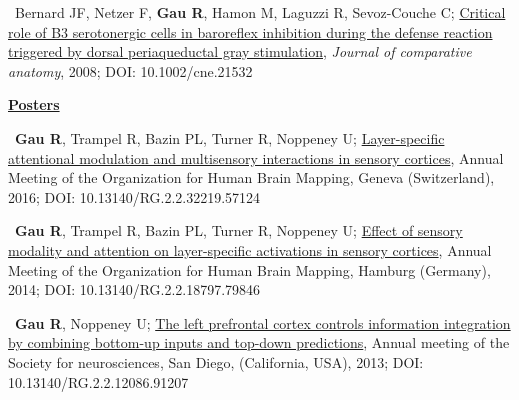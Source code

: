 \documentclass[a4paper,12pt,oneside]{letter}
\begin{document}
{\textbullet~Bernard JF, Netzer F, \textbf{Gau R}, Hamon M, Laguzzi R, Sevoz-Couche C; 
\href{http://www.researchgate.net/profile/Remi_Gau/publication/5856955_Critical_role_of_B3_serotonergic_cells_in_baroreflex_inhibition_during_the_defense_reaction_triggered_by_dorsal_periaqueductal_gray_stimulation/links/586bf81d08ae6eb871bb6f47.pdf}{Critical role of B3 serotonergic cells in baroreflex inhibition during the defense reaction triggered by dorsal periaqueductal gray stimulation}, \textit{Journal of comparative anatomy}, 2008; DOI: 10.1002/cne.21532


\begin{center}
 \href{https://osf.io/xgdh7/}{\large\textbf{Posters}}
\end{center}

\textbullet~\textbf{Gau R}, Trampel R, Bazin PL, Turner R, Noppeney U; \href{http://www.researchgate.net/profile/Remi_Gau/publication/312040907_Layer-specific_attentional_modulation_and_multisensory_interactions_in_sensory_cortices/links/586bec8108ae8fce4919e07e.pdf?origin=publication_detail&ev=pub_int_prw_xdl&msrp=ebfE-ttTbrYfVzAofje5aX7FDjiW85HC3yqk8seJjhsOoLqmeRviQBtfDuXmv_czDArKxDp2vM32swxlbQzyvbVTbKL6xRpsEZ-BeqgslOo.KWD8vv500DrprbLnXSrDxinWDQrliScdbic1rjyyqLUG12KOwbjri9jbFDwSYWMkGLoSocKyAei7eQLoDCU9Dw.4eQVGmpcVG-AAQDI4KiYt-xA9SDkF_u7xvWOznoi52trnfagq5aJVIAgpfhgitdzt3LYuUPdJ8gE6jmG5I94Nw}{Layer-specific attentional modulation and multisensory interactions in sensory cortices}, Annual Meeting of the Organization for Human Brain Mapping, Geneva (Switzerland), 2016; DOI: 10.13140/RG.2.2.32219.57124

\textbullet~\textbf{Gau R}, Trampel R, Bazin PL, Turner R, Noppeney U; \href{http://www.researchgate.net/profile/Remi_Gau/publication/312040995_Effect_of_sensory_modality_and_attention_on_layer-specific_activations_in_sensory_cortices/links/586bef4108ae329d621216ff.pdf?origin=publication_detail&ev=pub_int_prw_xdl&msrp=rWGQkC7vAu_P6H2YxCI3M31egmAPzpbXdoRN1OdTlFE2ytvRyytc2DItV2mPnvlGPXAOT-Q0hOx0cWKEfhvF_ZK7oOzQtXTOX1cxj1f7wdc.EjFU3lhxIUR_qptyNrCYqZDXVg6nG7zWe8VL0WxLSdSMUGnjz_v4L5Yov-RWctdEwDPFRXLasy1FBdCk7Dlydw.IANTdlTw5MPB88HQJNdTi7lFv6Sygddbknct3mMTSsgH20heYrYcKnbsQLxtcsNd-HHWZUEIEP4-7bkQLNDUhQ}{Effect of sensory modality and attention on layer-specific activations in sensory cortices}, Annual Meeting of the Organization for Human Brain Mapping, Hamburg (Germany), 2014; DOI: 10.13140/RG.2.2.18797.79846

\textbullet~\textbf{Gau R}, Noppeney U; \href{http://www.researchgate.net/profile/Remi_Gau/publication/312040995_Effect_of_sensory_modality_and_attention_on_layer-specific_activations_in_sensory_cortices/links/586bef4108ae329d621216ff.pdf?origin=publication_detail&ev=pub_int_prw_xdl&msrp=rWGQkC7vAu_P6H2YxCI3M31egmAPzpbXdoRN1OdTlFE2ytvRyytc2DItV2mPnvlGPXAOT-Q0hOx0cWKEfhvF_ZK7oOzQtXTOX1cxj1f7wdc.EjFU3lhxIUR_qptyNrCYqZDXVg6nG7zWe8VL0WxLSdSMUGnjz_v4L5Yov-RWctdEwDPFRXLasy1FBdCk7Dlydw.IANTdlTw5MPB88HQJNdTi7lFv6Sygddbknct3mMTSsgH20heYrYcKnbsQLxtcsNd-HHWZUEIEP4-7bkQLNDUhQ}{The left prefrontal cortex controls information integration by combining bottom-up inputs and top-down predictions}, Annual meeting of the Society for neurosciences, San Diego, (California, USA), 2013; DOI: 10.13140/RG.2.2.12086.91207

}
\end{document}
